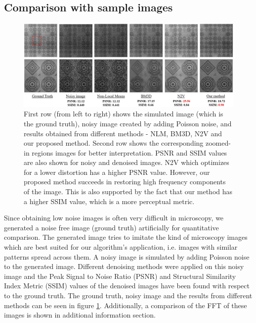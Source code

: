 \documentclass[fleqn,10pt]{wlscirep}
\begin{document}
	
	\subsection*{Comparison with sample images}
	
	\begin{figure}[H]
		\centering
		\includegraphics[scale=0.5]{./imgs/comparison_sample_new_zoomed.jpg}
		\caption{First row (from left to right) shows the simulated image (which is the ground truth), noisy image created by adding Poisson noise, and  results obtained from different methods - NLM, BM3D, N2V and our proposed method. Second row shows the corresponding zoomed-in regions images for better interpretation. PSNR and SSIM values are also shown for noisy and denoised images. N2V which optimizes for a lower distortion has a higher PSNR value. However, our proposed method succeeds in restoring high frequency components of the image. This is also supported by the fact that our method has a higher SSIM value, which is a more perceptual metric.}
		\label{fig:comparison_sample}
	\end{figure}


	Since obtaining low noise images is often very difficult in microscopy, we generated a noise free image (ground truth) artificially for quantitative comparison. The generated image tries to imitate the kind of microscopy images which are best suited for our algorithm's application, i.e. images with similar patterns spread across them. A noisy image is simulated by adding Poisson noise to the generated image. Different denoising methods were applied on this noisy image and the Peak Signal to Noise Ratio (PSNR) and Structural Similarity Index Metric (SSIM) values of the denoised images have been found with respect to the ground truth. The ground truth, noisy image and the results from different methods can be seen in figure \ref{fig:comparison_sample}. Additionally, a comparison of the FFT of these images is shown in additional information section.
	
\end{document}
